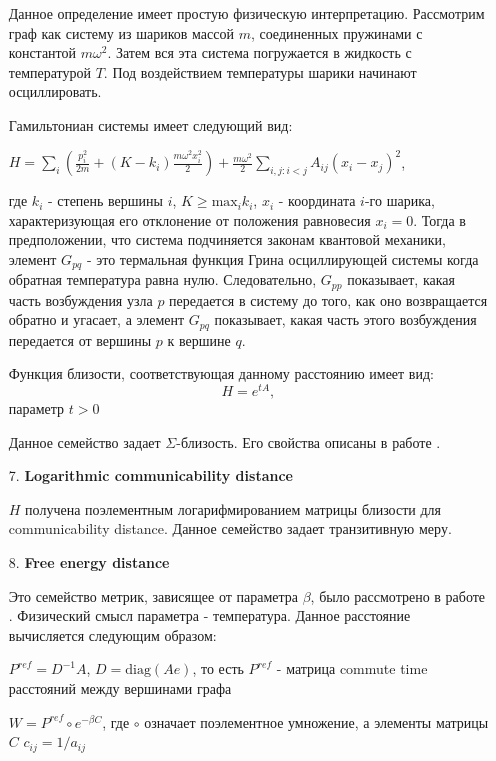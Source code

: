 \begin{itemize}
Данное определение имеет простую физическую интерпретацию. Рассмотрим граф как систему из шариков массой $m$, соединенных пружинами с константой $m \omega ^2$. Затем вся эта система погружается в жидкость с температурой $T$. Под воздействием температуры шарики начинают осциллировать.

Гамильтониан системы имеет следующий вид:

$H = \sum\limits_{i} \left(\frac{p_i^2}{2m} + (K-k_i)\frac{m\omega ^2 x_i^2}{2}\right) + \frac{m \omega ^2}{2} \sum\limits_{i,j : i<j} A_{ij} (x_i-x_j)^2 $,

где $k_i$ - степень вершины $i$, $K \ge \text{max}_i k_i$, $x_i$ - координата $i$-го шарика, характеризующая его отклонение от положения равновесия $x_i =0$. Тогда в предположении, что система подчиняется законам квантовой механики, элемент $G_{pq}$ - это термальная функция Грина осциллирующей системы когда обратная температура равна нулю. Следовательно, $G_{pp}$ показывает, какая часть возбуждения узла $p$ передается в систему до того, как оно возвращается обратно и угасает, а элемент $G_{pq}$ показывает, какая часть этого возбуждения передается от вершины $p$ к вершине $q$. 


Функция близости, соответствующая данному расстоянию имеет вид:
\begin{equation}
H = e^{tA},
\end{equation}
 параметр $t > 0$
 
Данное семейство задает $\Sigma$-близость. Его свойства описаны в работе \cite{estrada2012communicability}.

\item[7.] \textbf{Logarithmic communicability distance}

$H$ получена поэлементным логарифмированием матрицы близости для communicability distance. Данное семейство задает транзитивную меру.

\item[8.] \textbf{Free energy distance}

Это семейство метрик, зависящее от параметра $\beta$, было рассмотрено в работе \cite{kivimaki2014developments}. Физический смысл параметра - температура. Данное расстояние вычисляется следующим образом:

$P^{ref} = D^{-1}A$, $D = \text{diag}(Ae)$, то есть $P^{ref}$ - матрица commute time расстояний между вершинами графа

$W = P^{ref} \circ e^{-\beta C}$, где $\circ$ означает поэлементное умножение, а элементы матрицы $C$ $c_{ij} = 1 / a_{ij}$


\end{itemize}
